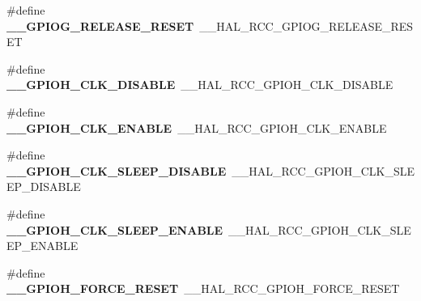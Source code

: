 \begin{DoxyCompactItemize}
\item 
\#define {\bfseries \+\_\+\+\_\+\+G\+P\+I\+O\+G\+\_\+\+R\+E\+L\+E\+A\+S\+E\+\_\+\+R\+E\+S\+ET}~\+\_\+\+\_\+\+H\+A\+L\+\_\+\+R\+C\+C\+\_\+\+G\+P\+I\+O\+G\+\_\+\+R\+E\+L\+E\+A\+S\+E\+\_\+\+R\+E\+S\+ET\hypertarget{group___h_a_l___r_c_c___aliased_ga832664434143cecc9b9596da4dbf0b2f}{}\label{group___h_a_l___r_c_c___aliased_ga832664434143cecc9b9596da4dbf0b2f}

\item 
\#define {\bfseries \+\_\+\+\_\+\+G\+P\+I\+O\+H\+\_\+\+C\+L\+K\+\_\+\+D\+I\+S\+A\+B\+LE}~\+\_\+\+\_\+\+H\+A\+L\+\_\+\+R\+C\+C\+\_\+\+G\+P\+I\+O\+H\+\_\+\+C\+L\+K\+\_\+\+D\+I\+S\+A\+B\+LE\hypertarget{group___h_a_l___r_c_c___aliased_gad91af796c93891e05794ca2e567c5e19}{}\label{group___h_a_l___r_c_c___aliased_gad91af796c93891e05794ca2e567c5e19}

\item 
\#define {\bfseries \+\_\+\+\_\+\+G\+P\+I\+O\+H\+\_\+\+C\+L\+K\+\_\+\+E\+N\+A\+B\+LE}~\+\_\+\+\_\+\+H\+A\+L\+\_\+\+R\+C\+C\+\_\+\+G\+P\+I\+O\+H\+\_\+\+C\+L\+K\+\_\+\+E\+N\+A\+B\+LE\hypertarget{group___h_a_l___r_c_c___aliased_ga137644483fad343beaaa3da30fcb38dc}{}\label{group___h_a_l___r_c_c___aliased_ga137644483fad343beaaa3da30fcb38dc}

\item 
\#define {\bfseries \+\_\+\+\_\+\+G\+P\+I\+O\+H\+\_\+\+C\+L\+K\+\_\+\+S\+L\+E\+E\+P\+\_\+\+D\+I\+S\+A\+B\+LE}~\+\_\+\+\_\+\+H\+A\+L\+\_\+\+R\+C\+C\+\_\+\+G\+P\+I\+O\+H\+\_\+\+C\+L\+K\+\_\+\+S\+L\+E\+E\+P\+\_\+\+D\+I\+S\+A\+B\+LE\hypertarget{group___h_a_l___r_c_c___aliased_gae773715af6901369b9c070da4186c482}{}\label{group___h_a_l___r_c_c___aliased_gae773715af6901369b9c070da4186c482}

\item 
\#define {\bfseries \+\_\+\+\_\+\+G\+P\+I\+O\+H\+\_\+\+C\+L\+K\+\_\+\+S\+L\+E\+E\+P\+\_\+\+E\+N\+A\+B\+LE}~\+\_\+\+\_\+\+H\+A\+L\+\_\+\+R\+C\+C\+\_\+\+G\+P\+I\+O\+H\+\_\+\+C\+L\+K\+\_\+\+S\+L\+E\+E\+P\+\_\+\+E\+N\+A\+B\+LE\hypertarget{group___h_a_l___r_c_c___aliased_gae329633399e09af91b5fe095a3ff869e}{}\label{group___h_a_l___r_c_c___aliased_gae329633399e09af91b5fe095a3ff869e}

\item 
\#define {\bfseries \+\_\+\+\_\+\+G\+P\+I\+O\+H\+\_\+\+F\+O\+R\+C\+E\+\_\+\+R\+E\+S\+ET}~\+\_\+\+\_\+\+H\+A\+L\+\_\+\+R\+C\+C\+\_\+\+G\+P\+I\+O\+H\+\_\+\+F\+O\+R\+C\+E\+\_\+\+R\+E\+S\+ET\hypertarget{group___h_a_l___r_c_c___aliased_gaa91b10bb9316fff010da4ecd09f636d5}{}\label{group___h_a_l___r_c_c___aliased_gaa91b10bb9316fff010da4ecd09f636d5}


\end{DoxyCompactItemize}
